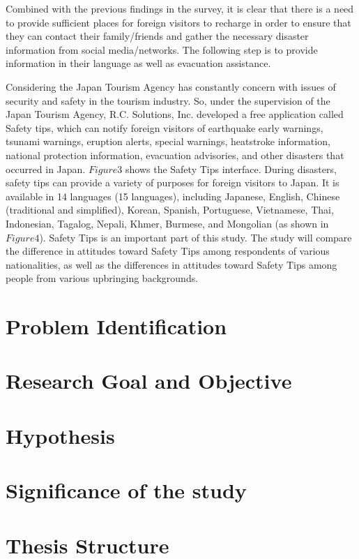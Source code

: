Combined with the previous findings in the survey, it is clear that there is a need to provide sufficient places for foreign visitors to recharge in order to ensure that they can contact their family/friends and gather the necessary disaster information from social media/networks. The following step is to provide information in their language as well as evacuation assistance.

Considering the Japan Tourism Agency has constantly concern with issues of security and safety in the tourism industry. So, under the supervision of the Japan Tourism Agency, R.C. Solutions, Inc. developed a free application called Safety tips, which can notify foreign visitors of earthquake early warnings, tsunami warnings, eruption alerts, special warnings, heatstroke information, national protection information, evacuation advisories, and other disasters that occurred in Japan. $Figure 3$ shows the Safety Tips interface. During disasters, safety tips can provide a variety of purposes for foreign visitors to Japan. It is available in 14 languages (15 languages), including Japanese, English, Chinese (traditional and simplified), Korean, Spanish, Portuguese, Vietnamese, Thai, Indonesian, Tagalog, Nepali, Khmer, Burmese, and Mongolian (as shown in $Figure 4$). Safety Tips is an important part of this study. The study will compare the difference in attitudes toward Safety Tips among respondents of various nationalities, as well as the differences in attitudes toward Safety Tips among people from various upbringing backgrounds.

\section{Problem Identification}
\section{Research Goal and Objective}
\section{Hypothesis}
\section{Significance of the study}
\section{Thesis Structure}

